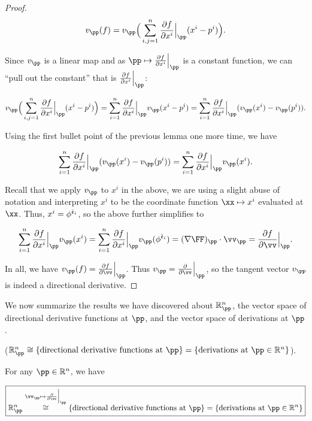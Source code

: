 \begin{proof}
    \begin{align*}
        v_\pp(f) 
        = v_\pp\Big(\sum_{i,j = 1}^n \frac{\pd f}{\pd x^i}\Big|_\pp (x^i - p^i)\Big).
    \end{align*}
    
    Since $v_\pp$ is a linear map and as $\pp \mapsto \frac{\pd f}{\pd x^i}\Big|_\pp$ is a constant function, we can ``pull out the constant'' that is $\frac{\pd f}{\pd x^i}\Big|_\pp$:
    
    \begin{align*}
        v_\pp\Big(\sum_{i,j = 1}^n \frac{\pd f}{\pd x^i}\Big|_\pp (x^i - p^i)\Big)
        = \sum_{i = 1}^n \frac{\pd f}{\pd x^i}\Big|_\pp v_\pp(x^i - p^i)
        = \sum_{i = 1}^n \frac{\pd f}{\pd x^i}\Big|_\pp (v_\pp(x^i) - v_\pp(p^i)).
    \end{align*}
    
    Using the first bullet point of the previous lemma one more time, we have
    
    \begin{align*}
        \sum_{i = 1}^n \frac{\pd f}{\pd x^i}\Big|_\pp (v_\pp(x^i) - v_\pp(p^i)) 
        = \sum_{i = 1}^n \frac{\pd f}{\pd x^i}\Big|_\pp v_\pp(x^i).
    \end{align*}
    
    Recall that we apply $v_\pp$ to $x^i$ in the above, we are using a slight abuse of notation and interpreting $x^i$ to be the coordinate function $\xx \mapsto x^i$ evaluated at $\xx$. Thus, $x^i = \phi^{\hat{\mathfrak{e}}_i}$, so the above further simplifies to
    
    \begin{align*}
        \sum_{i = 1}^n \frac{\pd f}{\pd x^i}\Big|_\pp v_\pp(x^i)
        =
        \sum_{i = 1}^n \frac{\pd f}{\pd x^i}\Big|_\pp v_\pp(\phi^{\see_i})
        = (\nabla \FF)_\pp \cdot \vv_\pp
        = \frac{\pd f}{\pd \vv}\Big|_\pp.
    \end{align*}
    
    In all, we have $v_\pp(f) = \frac{\pd f}{\pd \vv}\Big|_\pp$. Thus $v_\pp = \frac{\pd}{\pd \vv}\Big|_\pp$, so the tangent vector $v_\pp$ is indeed a directional derivative. 
\end{proof}

We now summarize the results we have discovered about $\R^n_\pp$, the vector space of directional derivative functions at $\pp$, and the vector space of derivations at $\pp$.

\begin{theorem}
    ($\R^n_\pp \cong \{ \text{directional derivative functions at $\pp$} \} = \{ \text{derivations at $\pp \in \R^n$} \}$).

    For any $\pp \in \R^n$, we have
    
    \begin{align*}
        \boxed
        {
            \R^n_\pp \overset{\vv_\pp \mapsto \frac{\pd}{\pd \vv}\Big|_\pp}{\cong} \{ \text{directional derivative functions at $\pp$} \} = \{ \text{derivations at $\pp \in \R^n$} \}
        }
    \end{align*}
\end{theorem}

